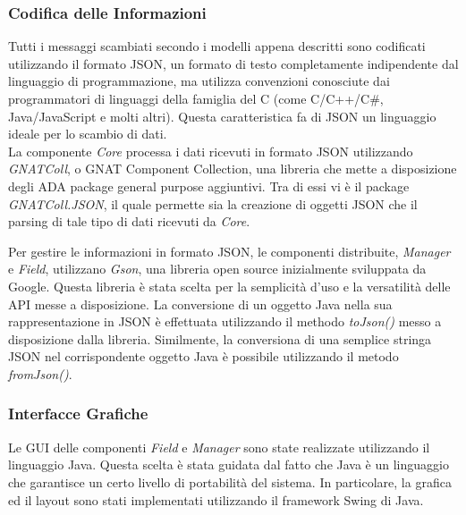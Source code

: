 \subsubsection{Codifica delle Informazioni}
Tutti i messaggi scambiati secondo i modelli appena descritti sono codificati utilizzando il formato JSON, un formato di testo completamente indipendente dal linguaggio di programmazione, ma utilizza convenzioni conosciute dai programmatori di linguaggi della famiglia del C (come C/C++/C\#, Java/JavaScript e molti altri). Questa caratteristica fa di JSON un linguaggio ideale per lo scambio di dati.\\

La componente \emph{Core} processa i dati ricevuti in formato JSON utilizzando \emph{GNATColl}, o GNAT Component Collection, una libreria che mette a disposizione degli ADA package general purpose aggiuntivi. Tra di essi vi è il package \emph{GNATColl.JSON}, il quale permette sia la creazione di oggetti JSON che il parsing di tale tipo di dati ricevuti da \emph{Core}.

Per gestire le informazioni in formato JSON, le componenti distribuite, \emph{Manager} e \emph{Field}, utilizzano \emph{Gson}, una libreria open source  inizialmente sviluppata da Google. Questa libreria è stata scelta per la semplicità d'uso e la versatilità delle API messe a disposizione. La conversione di un oggetto Java nella sua rappresentazione in JSON è effettuata utilizzando il methodo \emph{toJson()} messo a disposizione dalla libreria. Similmente, la conversiona di una semplice stringa JSON nel corrispondente oggetto Java è possibile utilizzando il metodo \emph{fromJson()}. 

\subsubsection{Interfacce Grafiche}
Le GUI delle componenti \emph{Field} e \emph{Manager} sono state realizzate utilizzando il linguaggio Java. Questa scelta è stata guidata dal fatto che Java è un linguaggio che garantisce un certo livello di portabilità del sistema. In particolare, la grafica ed il layout sono stati implementati utilizzando il framework Swing di Java.